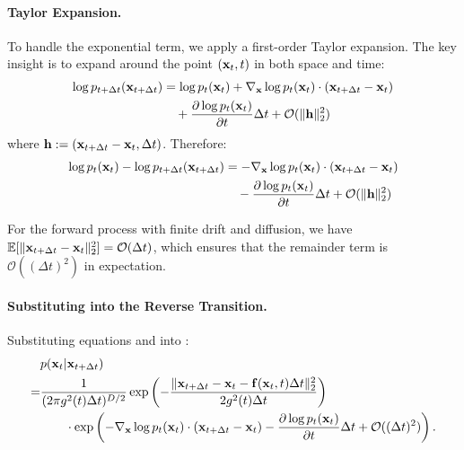 \paragraph{Taylor Expansion.} 
To handle the exponential term, we apply a first-order Taylor expansion. The key insight is to expand around the point $({\mathbf{x}}_t, t)$ in both space and time:
\begin{align*}
    \log p_{t+\Delta t}({\mathbf{x}}_{t+\Delta t}) &= \log p_t({\mathbf{x}}_t) + \nabla_{{\mathbf{x}}} \log p_t({\mathbf{x}}_t) \cdot ({\mathbf{x}}_{t+\Delta t} - {\mathbf{x}}_t) \nonumber \\
    &\quad + \frac{\partial \log p_t({\mathbf{x}}_t)}{\partial t} \Delta t + \mathcal{O}(\|{\mathbf{h}}\|_2^2) 
\end{align*}
where ${\mathbf{h}} := ({\mathbf{x}}_{t+\Delta t} - {\mathbf{x}}_t, \Delta t)$. Therefore:
\begin{align}
    \log p_t({\mathbf{x}}_t) - \log p_{t+\Delta t}({\mathbf{x}}_{t+\Delta t}) &= -\nabla_{{\mathbf{x}}} \log p_t({\mathbf{x}}_t) \cdot ({\mathbf{x}}_{t+\Delta t} - {\mathbf{x}}_t) \nonumber \\
    &\quad - \frac{\partial \log p_t({\mathbf{x}}_t)}{\partial t} \Delta t + \mathcal{O}(\|{\mathbf{h}}\|_2^2) \label{eq:log-difference}
\end{align}

For the forward process with finite drift and diffusion, we have $\mathbb{E}[\|{\mathbf{x}}_{t+\Delta t} - {\mathbf{x}}_t\|_2^2] = \mathcal{O}(\Delta t)$, which ensures that the remainder term is $\mathcal{O}((\Delta t)^2)$ in expectation.

\paragraph{Substituting into the Reverse Transition.}
Substituting equations  and  into :
\begin{align*}
    &p({\mathbf{x}}_t | {\mathbf{x}}_{t+\Delta t}) \nonumber \\
    = &\frac{1}{(2\pi g^2(t) \Delta t)^{D/2}} \exp\left(-\frac{\|{\mathbf{x}}_{t+\Delta t} - {\mathbf{x}}_t - {\mathbf{f}}({\mathbf{x}}_t, t) \Delta t\|_2^2}{2 g^2(t) \Delta t}\right) \nonumber \\
    &\qquad \cdot \exp\left(-\nabla_{{\mathbf{x}}} \log p_t({\mathbf{x}}_t) \cdot ({\mathbf{x}}_{t+\Delta t} - {\mathbf{x}}_t) - \frac{\partial \log p_t({\mathbf{x}}_t)}{\partial t} \Delta t + \mathcal{O}((\Delta t)^2)\right). 
\end{align*}
